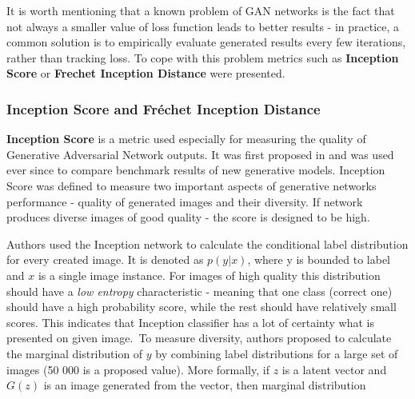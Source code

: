 \documentclass[11pt,a4paper,openany]{book}
\begin{document}
\noindent It is worth mentioning that a known problem of GAN networks is the fact that not always a smaller value of loss function leads to better results - in practice, a common solution is to empirically evaluate generated results every few iterations, rather than tracking loss. To cope with this problem metrics such as \textbf{Inception Score} or \textbf{Frechet Inception Distance} were presented. 

\subsubsection*{Inception Score and Fr\'echet Inception Distance}



\noindent \textbf{Inception Score} is a metric used especially for measuring the quality of Generative Adversarial Network outputs. It was first proposed in \cite{improvedgans} and was used ever since to compare benchmark results of new generative models. Inception Score was defined to measure two important aspects of generative networks performance - quality of generated images and their diversity. If network produces diverse images of good quality - the score is designed to be high.\


\noindent Authors used the Inception network \cite{inception} to calculate the conditional label distribution for every created image. It is denoted as $p(y|x)$, where y is bounded to label and $x$ is a single image instance. For images of high quality this distribution should have a \textit{low entropy} characteristic - meaning that one class (correct one) should have a high probability score, while the rest should have relatively small scores. This indicates that Inception classifier has a lot of certainty what is presented on given image.\ 
To measure diversity, authors proposed to calculate the marginal distribution of $y$ by combining label distributions for a large set of images (50 000 is a proposed value). More formally, if $z$ is a latent vector and $G(z)$ is an image generated from the vector, then marginal distribution 
\end{document}
